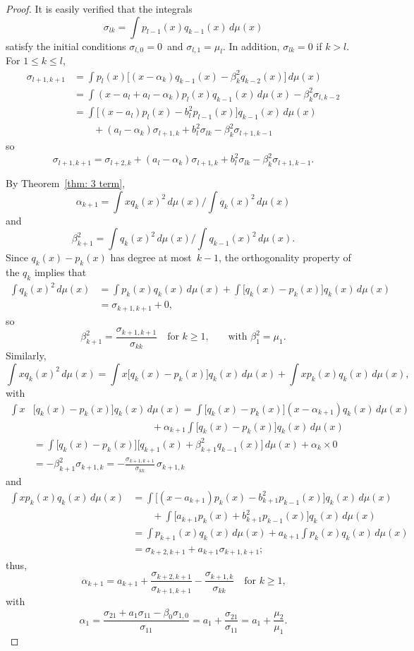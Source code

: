 \documentclass[12pt,a4paper]{article}
\begin{document}
\begin{proof}
It is easily verified that the integrals
\[
\sigma_{lk}=\int p_{l-1}(x)q_{k-1}(x)\,d\mu(x)
\]
satisfy the initial conditions $\sigma_{l,0}=0$~and 
$\sigma_{l,1}=\mu_l$.  In addition, $\sigma_{lk}=0$ if $k>l$. 
For $1\le k\le l$,
\begin{align*}
\sigma_{l+1,k+1}&=\int p_l(x)\bigl[
(x-\alpha_k)q_{k-1}(x)-\beta_k^2q_{k-2}(x)\bigr]\,d\mu(x)\\
	&=\int(x-a_l+a_l-\alpha_k)p_l(x)q_{k-1}(x)\,d\mu(x)
		-\beta_k^2\sigma_{l,k-2}\\
	&=\int\bigl[(x-a_l)p_l(x)-b_l^2p_{l-1}(x)\bigr]
		q_{k-1}(x)\,d\mu(x)\\
	&\qquad{}+(a_l-\alpha_k)\sigma_{l+1,k}
		+b_l^2\sigma_{lk}-\beta_k^2\sigma_{l+1,k-1}
\end{align*}
so
\[
\sigma_{l+1,k+1}=\sigma_{l+2,k}+(a_l-\alpha_k)\sigma_{l+1,k}
		+b_l^2\sigma_{lk}-\beta_k^2\sigma_{l+1,k-1}.
\]

By Theorem~\ref{thm: 3 term},
\[
\alpha_{k+1}=\int xq_k(x)^2\,d\mu(x)\bigg/\int q_k(x)^2\,d\mu(x)
\]
and
\[
\beta_{k+1}^2=\int q_k(x)^2\,d\mu(x)\bigg/\int q_{k-1}(x)^2\,d\mu(x).
\]
Since $q_k(x)-p_k(x)$ has degree at most~$k-1$, the orthogonality 
property of the $q_k$ implies that
\begin{align*}
\int q_k(x)^2\,d\mu(x)&=\int p_k(x)q_k(x)\,d\mu(x)
	+\int\bigl[q_k(x)-p_k(x)\bigr]q_k(x)\,d\mu(x)\\
	&=\sigma_{k+1,k+1}+0,
\end{align*}
so
\[
\beta_{k+1}^2=\frac{\sigma_{k+1,k+1}}{\sigma_{kk}}
	\quad\text{for $k\ge1$,}
	\qquad\text{with $\beta_1^2=\mu_1$.}
\]
Similarly,
\[
\int x q_k(x)^2\,d\mu(x)
	=\int x\bigl[q_k(x)-p_k(x)\bigr]q_k(x)\,d\mu(x)
	+\int xp_k(x)q_k(x)\,d\mu(x),
\]
with
\begin{align*}
\int x&\bigl[q_k(x)-p_k(x)\bigr]q_k(x)\,d\mu(x)
	=\int\bigl[q_k(x)-p_k(x)\bigr](x-\alpha_{k+1})q_k(x)\,d\mu(x)\\
	&\qquad\qquad\qquad\qquad\qquad\qquad{}+\alpha_{k+1}\int 
		\bigl[q_k(x)-p_k(x)\bigr]q_k(x)\,d\mu(x)\\
	&=\int\bigl[q_k(x)-p_k(x)\bigr]
	\bigl[q_{k+1}(x)+\beta_{k+1}^2 q_{k-1}(x)\bigr] 
		\,d\mu(x)+\alpha_k\times0\\
	&=-\beta_{k+1}^2\sigma_{k+1,k}
	=-\frac{\sigma_{k+1,k+1}}{\sigma_{kk}}\,\sigma_{k+1,k}
\end{align*}
and
\begin{align*}
\int xp_k(x)q_k(x)\,d\mu(x)&=\int\bigl[
	(x-a_{k+1})p_k(x)-b_{k+1}^2p_{k-1}(x)\bigr]q_k(x)\,d\mu(x)\\
	&\qquad{}+\int\bigl[
		a_{k+1}p_k(x)+b_{k+1}^2p_{k-1}(x)\bigr]q_k(x)\,d\mu(x)\\
	&=\int p_{k+1}(x)q_k(x)\,d\mu(x)
		+a_{k+1}\int p_k(x)q_k(x)\,d\mu(x)\\
	&=\sigma_{k+2,k+1}+a_{k+1}\sigma_{k+1,k+1};
\end{align*}
thus,
\[
\alpha_{k+1}=a_{k+1}+\frac{\sigma_{k+2,k+1}}{\sigma_{k+1,k+1}}
	-\frac{\sigma_{k+1,k}}{\sigma_{kk}}
	\quad\text{for $k\ge1$,}
\]
with
\[
\alpha_1=\frac{\sigma_{21}+a_1\sigma_{11}-\beta_0\sigma_{1,0}}%
{\sigma_{11}}=a_1+\frac{\sigma_{21}}{\sigma_{11}}
	=a_1+\frac{\mu_2}{\mu_1}.
\]
\end{proof}
\end{document}
